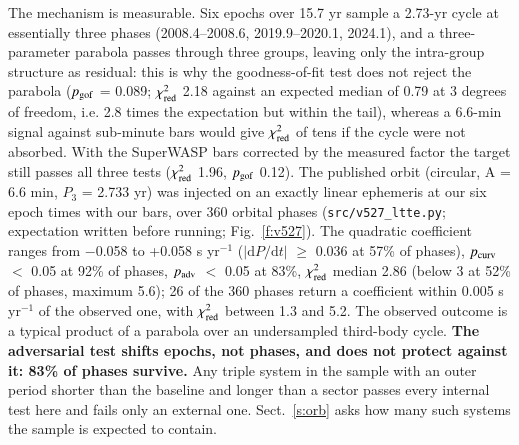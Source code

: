 \documentclass{aa}
\begin{document}
The mechanism is measurable. Six epochs over 15.7 yr sample a 2.73-yr cycle at essentially three phases (2008.4--2008.6, 2019.9--2020.1, 2024.1), and a three-parameter parabola passes through three groups, leaving only the intra-group structure as residual: this is why the goodness-of-fit test does not reject the parabola ($p_{\rm gof}$ = 0.089; $\chi^2_{\rm red}$ 2.18 against an expected median of 0.79 at 3 degrees of freedom, i.e. 2.8 times the expectation but within the tail), whereas a 6.6-min signal against sub-minute bars would give $\chi^2_{\rm red}$ of tens if the cycle were not absorbed. With the SuperWASP bars corrected by the measured factor the target still passes all three tests ($\chi^2_{\rm red}$ 1.96, $p_{\rm gof}$ 0.12). The published orbit (circular, A = 6.6 min, $P_3$ = 2.733 yr) was injected on an exactly linear ephemeris at our six epoch times with our bars, over 360 orbital phases (\texttt{src/v527\_ltte.py}; expectation written before running; Fig.~\ref{f:v527}). The quadratic coefficient ranges from $-$0.058 to +0.058 s yr$^{-1}$ ($|\mathrm{d}P/\mathrm{d}t|$ $\ge$ 0.036 at 57\% of phases), $p_{\rm curv}$ $<$ 0.05 at 92\% of phases, $p_{\rm adv}$ $<$ 0.05 at 83\%, $\chi^2_{\rm red}$ median 2.86 (below 3 at 52\% of phases, maximum 5.6); 26 of the 360 phases return a coefficient within 0.005 s yr$^{-1}$ of the observed one, with $\chi^2_{\rm red}$ between 1.3 and 5.2. The observed outcome is a typical product of a parabola over an undersampled third-body cycle. \textbf{The adversarial test shifts epochs, not phases, and does not protect against it: 83\% of phases survive.} Any triple system in the sample with an outer period shorter than the baseline and longer than a sector passes every internal test here and fails only an external one. Sect.~\ref{s:orb} asks how many such systems the sample is expected to contain.
\end{document}
